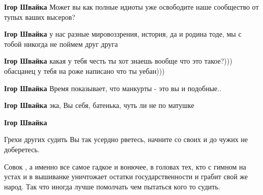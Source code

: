 \begin{itemize}
\begin{itemize}
\textbf{Ігор Швайка} Может вы как полные идиоты уже освободите наше сообщество от тупых ваших высеров?

 
\textbf{Ігор Швайка} у нас разные мировоззрения, история, да и родина тоде, мы с тобой никогда не поймем друг друга

 
\textbf{Ігор Швайка} какая у тебя честь ты хот знаешь вообще что это такое?))) обасцанец у тебя на роже написано что ты уебан)))

 
\textbf{Ігор Швайка} Время показывает, что манкурты - это вы и подобные..

 
\textbf{Ігор Швайка} эка, Вы себя, батенька, чуть ли не по матушке

 
\textbf{Ігор Швайка} 

Грехи других судить Вы так усердно рветесь, начните со своих и до чужих не
доберетесь.

Совок , а именно все самое гадкое и вонючее, в головах тех, кто с гимном на
устах и в вышиванке уничтожает остатки государственности и грабит свой же
народ. Так что иногда лучше помолчать чем пытаться кого то судить.



\end{itemize}
\end{itemize}
